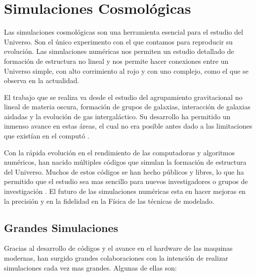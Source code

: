 
\chapter{Simulaciones Cosmológicas}
\label{chap:2 Sim}
\setcounter{equation}{0}

\noindent Las simulaciones cosmológicas son una herramienta esencial para el estudio del Universo. Son el único experimento con el que contamos para reproducir su evolución. Las simulaciones numéricas nos permiten un estudio detallado de formación de estructura no lineal y nos permite hacer conexiones entre un Universo simple, con alto corrimiento al rojo y con uno complejo, como el que se observa en la actualidad.

El trabajo que se realiza va desde el estudio del agrupamiento gravitacional no lineal de materia oscura, formación de grupos de galaxias, interacción de galaxias aisladas y la evolución de gas intergaláctico. Su desarrollo ha permitido un inmenso avance en estas áreas, el cual no era posible antes dado a las limitaciones que existían en el computó \cite{2001NewA....6...79S}.


Con la rápida evolución en el rendimiento de las computadoras y algoritmos numéricos, han nacido múltiples códigos que simulan la formación de estructura del Universo. Muchos de estos códigos se han hecho públicos y libres, lo que ha permitido que el estudio sea mas sencillo para nuevos investigadores o grupos de investigación \cite{2021MNRAS.506.2871S}. El futuro de las simulaciones numéricas esta en hacer mejoras en la precisión y en la fidelidad en la Física de las técnicas de modelado.

\newpage

\section{Grandes Simulaciones}

Gracias al desarrollo de códigos y el avance en el hardware de las maquinas modernas, han surgido grandes colaboraciones con la intención de realizar simulaciones cada vez mas grandes. Algunas de ellas son:

